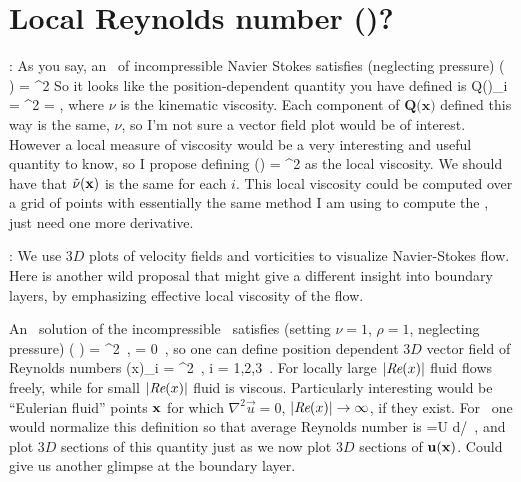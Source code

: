 \section{Local Reynolds number \Reynolds(\bx)?}
\label{sec:Rey}

: As you say, an \eqv\ of
incompressible Navier Stokes satisfies (neglecting pressure) \beq
\rho( \cdot\nabla) = \mu\nabla^{2}  \eeq So it
looks like the position-dependent quantity you have defined is \beq
Q(\bx)_{i} = 
     {\nabla^{2}  \cdot \jEigvec[i]} = \frac{\mu}{\rho}
     \equiv \nu, \eeq where $\nu$ is the kinematic viscosity.
  Each
     component of $\mathbf{Q\mathbf(x)}$ defined this way is the same, $\nu$, so
     I'm not sure a vector field plot would be of interest. However
     a local measure of viscosity would be a very interesting and
     useful quantity to know, so I propose defining \beq
     \tilde{\nu}(\bx) = 
     {\nabla^{2}  \cdot \jEigvec[i]} \eeq as the local
     viscosity. We should have that $\tilde{\nu}({\bf x})$ is the same for each
     $i$. This local viscosity could be computed over a grid of
     points with essentially the same method I am using to compute
     the \velgradmat, just need one more derivative.


:
We use $3D$ plots of velocity fields and vorticities to visualize
Navier-Stokes flow. Here is another wild proposal that might
give a different insight into boundary layers, by emphasizing effective
local viscosity of the flow.

An \eqv\ solution of the incompressible  \NS\ satisfies (setting $\nu=1$,
$\rho=1$, neglecting pressure)
 \beq
( \cdot \nabla) = \nabla^{2} 
    \,,\qquad
\nabla \cdot {}  = 0
\,,
so one can define position dependent $3D$ vector field
of Reynolds numbers
 \beq
 \Reynolds(x)_i =
     {\nabla^{2}  \cdot \jEigvec[i]}
     \,,\qquad
     i = 1,2,3
 \,.
 \label{ReField}
 \eeq
For locally large $|\textit{Re}(x)|$
fluid flows freely, while for
small $|\textit{Re}(x)|$ fluid is  viscous. Particularly interesting
would be ``Eulerian fluid'' points ${\bf x}$ for which
$\nabla^{2} \vec{u} =0$, $|\textit{Re}(x)| \to \infty$,
if they exist. For \pCf\ one would
normalize this definition so that average Reynolds number
is
\beq
 \Reynolds ={U d}/{\nu}
 \,,
\eeq
and plot $3D$ sections of this quantity just as we now
plot $3D$ sections of ${\bf u}({\bf x})$. Could give us another
glimpse at the boundary layer.

